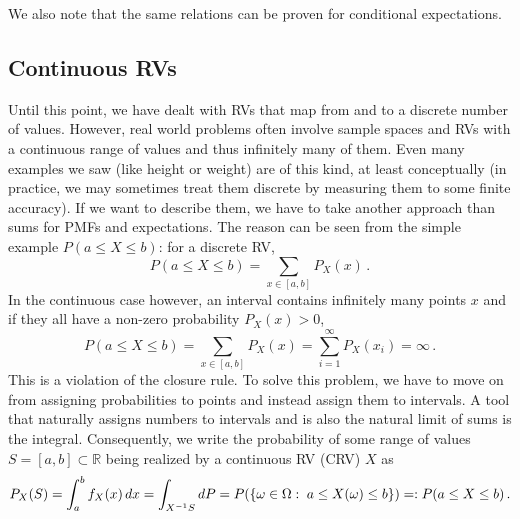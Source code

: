We also note that the same relations can be proven for conditional expectations.



	\subsection{Continuous RVs}\label{subsec:crvs}
Until this point, we have dealt with RVs that map from and to a discrete number of values. However, real world problems often involve sample spaces and RVs with a continuous range of values and thus infinitely many of them. Even many examples we saw (like height or weight) are of this kind, at least conceptually (in practice, we may sometimes treat them discrete by measuring them to some finite accuracy). If we want to describe them, we have to take another approach than sums for PMFs and expectations. The reason can be seen from the simple example $P(a \leq X \leq b)$: for a discrete RV,
\begin{equation}
P(a \leq X \leq b) = \sum_{x \in [a, b]} P_X(x) \, .
\end{equation}
In the continuous case however, an interval contains infinitely many points $x$ and if they all have a non-zero probability $P_X(x) > 0$,
\begin{equation}
P(a \leq X \leq b) = \sum_{x \in [a, b]} P_X(x) = \sum_{i = 1}^\infty P_X(x_i) = \infty \, .
\end{equation}
This is a violation of the closure rule. To solve this problem, we have to move on from assigning probabilities to points and instead assign them to intervals. A tool that naturally assigns numbers to intervals and is also the natural limit of sums is the integral. Consequently, we write the probability of some range of values $S = [a, b] \subset \mathbb{R}$ being realized by a continuous RV (CRV) $X$ as
\begin{equation}\label{eq:distr_crv}
P_X(S) = \int_a^b f_X(x) \, dx = \int_{X^{-1} S} dP = P\qty(\qty{\omega \in \Omega: \; a \leq X(\omega) \leq b}) =: P(a \leq X \leq b) \, .
\end{equation}
